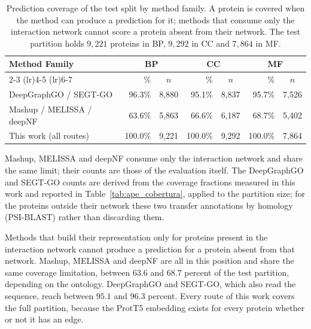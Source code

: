 \documentclass[Ingles]{ic-tese-v3}
\begin{document}
\begin{table}[!htb]
  \centering
  \caption{Prediction coverage of the test split by method family. A protein is covered when the method can produce a prediction for it; methods that consume only the interaction network cannot score a protein absent from their network. The test partition holds $9{,}221$ proteins in BP, $9{,}292$ in CC and $7{,}864$ in MF.}
  \label{tab:cobertura}
  \small
  \begin{tabular}{lrcrcrc} %
    \toprule
    \multirow{2}{*}{Method Family} & \multicolumn{2}{c}{BP} & \multicolumn{2}{c}{CC} & \multicolumn{2}{c}{MF} \\
    \cmidrule(lr){2-3} \cmidrule(lr){4-5} \cmidrule(lr){6-7}
    & \% & $n$ & \% & $n$ & \% & $n$ \\
    \midrule
    DeepGraphGO / SEGT-GO & 96.3\% & 8,880 & 95.1\% & 8,837 & 95.7\% & 7,526 \\
    Mashup / MELISSA / deepNF & 63.6\% & 5,863 & 66.6\% & 6,187 & 68.7\% & 5,402 \\
    This work (all routes) & 100.0\% & 9,221 & 100.0\% & 9,292 & 100.0\% & 7,864 \\
    \bottomrule
  \end{tabular}
  \par\smallskip\footnotesize\raggedright Mashup, MELISSA and deepNF consume only the interaction network and share the same limit; their counts are those of the evaluation itself. The DeepGraphGO and SEGT-GO counts are derived from the coverage fractions measured in this work and reported in Table~\ref{tab:ape_cobertura}, applied to the partition size; for the proteins outside their network these two transfer annotations by homology (PSI-BLAST) rather than discarding them.
\end{table}

Methods that build their representation only for proteins present in the interaction network cannot produce a prediction for a protein
absent from that network. Mashup, MELISSA and deepNF are all in this position and share the
same coverage limitation, between $63.6$ and $68.7$ percent of the test partition,
depending on the ontology. DeepGraphGO and SEGT-GO, which also read the sequence, reach
between $95.1$ and $96.3$ percent. Every route of this work covers the full partition,
because the ProtT5 embedding exists for every protein whether or not it has an edge.
\end{document}

